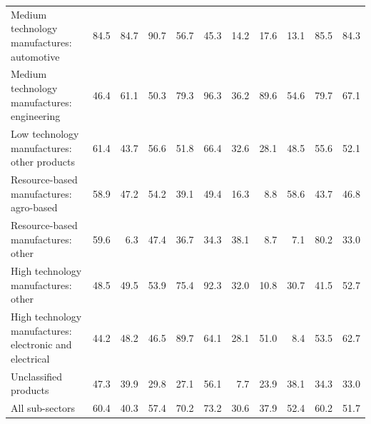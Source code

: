 \begin{tabular}{lrrrrrrrrrr}
Medium technology manufactures: automotive & 84.5 & 84.7 & 90.7 & 56.7 & 45.3 & 14.2 & 17.6 & 13.1 & 85.5 & 84.3 \\
Medium technology manufactures: engineering & 46.4 & 61.1 & 50.3 & 79.3 & 96.3 & 36.2 & 89.6 & 54.6 & 79.7 & 67.1 \\
Low technology manufactures: other products & 61.4 & 43.7 & 56.6 & 51.8 & 66.4 & 32.6 & 28.1 & 48.5 & 55.6 & 52.1 \\
Resource-based manufactures: agro-based & 58.9 & 47.2 & 54.2 & 39.1 & 49.4 & 16.3 & 8.8 & 58.6 & 43.7 & 46.8 \\
Resource-based manufactures: other & 59.6 & 6.3 & 47.4 & 36.7 & 34.3 & 38.1 & 8.7 & 7.1 & 80.2 & 33.0 \\
High technology manufactures: other & 48.5 & 49.5 & 53.9 & 75.4 & 92.3 & 32.0 & 10.8 & 30.7 & 41.5 & 52.7 \\
High technology manufactures: electronic and electrical & 44.2 & 48.2 & 46.5 & 89.7 & 64.1 & 28.1 & 51.0 & 8.4 & 53.5 & 62.7 \\
Unclassified products & 47.3 & 39.9 & 29.8 & 27.1 & 56.1 & 7.7 & 23.9 & 38.1 & 34.3 & 33.0 \\
All sub-sectors & 60.4 & 40.3 & 57.4 & 70.2 & 73.2 & 30.6 & 37.9 & 52.4 & 60.2 & 51.7 \\
\bottomrule
\end{tabular}
